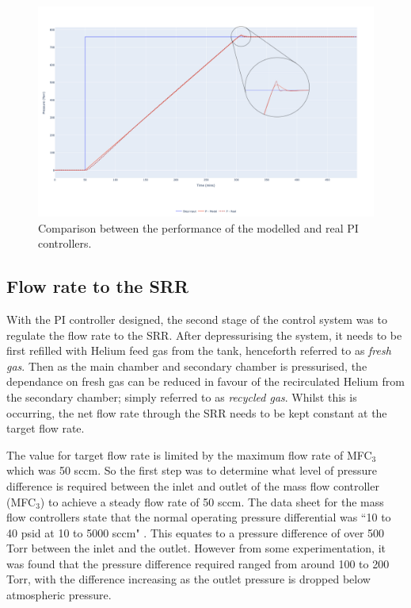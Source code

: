\begin{figure}[h!]
	\centering
	\includegraphics[width=\linewidth]{chapter_5/figures/real_pi_vs_model.png}
	\caption{Comparison between the performance of the modelled and real PI controllers.}
	\label{fig:pi_performance}
\end{figure}



\subsection{Flow rate to the SRR}

With the PI controller designed, the second stage of the control system was to regulate the flow rate to the SRR. After depressurising the system, it needs to be first refilled with Helium feed gas from the tank, henceforth referred to as \textit{fresh gas}. Then as the main chamber and secondary chamber is pressurised, the dependance on fresh gas can be reduced in favour of the recirculated Helium from the secondary chamber; simply referred to as \textit{recycled gas}. Whilst this is occurring, the net flow rate through the SRR needs to be kept constant at the target flow rate. 

The value for target flow rate is limited by the maximum flow rate of MFC$_3$ which was 50 sccm. So the first step was to determine what level of pressure difference is required between the inlet and outlet of the mass flow controller (MFC$_3$) to achieve a steady flow rate of 50 sccm. The data sheet for the mass flow controllers state that the normal operating pressure differential was ``10 to 40 psid at 10 to 5000 sccm" \cite{mks_ge50}. This equates to a pressure difference of over 500 Torr between the inlet and the outlet. However from some experimentation, it was found that the pressure difference required ranged from around 100 to 200 Torr, with the difference increasing as the outlet pressure is dropped below atmospheric pressure.


